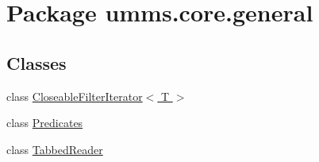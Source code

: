 \hypertarget{namespaceumms_1_1core_1_1general}{\section{Package umms.\+core.\+general}
\label{namespaceumms_1_1core_1_1general}
}
\subsection*{Classes}
\begin{DoxyCompactItemize}
\item 
class \hyperlink{classumms_1_1core_1_1general_1_1_closeable_filter_iterator_3_01_t_01_4}{Closeable\+Filter\+Iterator$<$ T $>$}
\item 
class \hyperlink{classumms_1_1core_1_1general_1_1_predicates}{Predicates}
\item 
class \hyperlink{classumms_1_1core_1_1general_1_1_tabbed_reader}{Tabbed\+Reader}
\end{DoxyCompactItemize}
